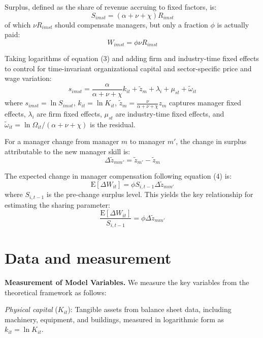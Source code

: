 \documentclass[11pt,a4paper]{article}
\begin{document}
Surplus, defined as the share of revenue accruing to fixed factors, is:
\begin{equation}
S_{imst} = (\alpha+\nu+\chi) R_{imst}
\end{equation}
of which $\nu R_{imst}$ should compensate managers, but only a fraction $\phi$ is actually paid:
\begin{equation}
W_{imst} = \phi\nu R_{imst}
\end{equation}

Taking logarithms of equation (3) and adding firm and industry-time fixed effects to control for time-invariant organizational capital and sector-specific price and wage variation:
\begin{equation}
s_{imst} = \frac{\alpha}{\alpha+\nu+\chi} k_{it} + \tilde{z}_{m} + \lambda_i + \mu_{st} + \tilde{\omega}_{it}
\end{equation}
where $s_{imst} = \ln S_{imst}$, $k_{it} = \ln K_{it}$, $\tilde{z}_m = \frac{\nu}{\alpha+\nu+\chi}z_{m}$ captures manager fixed effects, $\lambda_i$ are firm fixed effects, $\mu_{st}$ are industry-time fixed effects, and $\tilde{\omega}_{it} = \ln\Omega_{it}/(\alpha+\nu+\chi)$ is the residual.

For a manager change from manager $m$ to manager $m'$, the change in surplus attributable to the new manager skill is:
\begin{equation}
\Delta \tilde{z}_{mm'} = \tilde{z}_{m'} - \tilde{z}_{m}
\end{equation}

The expected change in manager compensation following equation (4) is:
\begin{equation}
\text{E}[\Delta W_{it}] = \phi S_{i,t-1} \Delta \tilde{z}_{mm'}
\end{equation}
where $S_{i,t-1}$ is the pre-change surplus level. This yields the key relationship for estimating the sharing parameter:
\begin{equation}
\frac{\text{E}[\Delta W_{it}]}{S_{i,t-1}} = \phi \Delta \tilde{z}_{mm'}
\end{equation}

\section{Data and measurement}

\textbf{Measurement of Model Variables.} We measure the key variables from the theoretical framework as follows:

\textit{Physical capital} ($K_{it}$): Tangible assets from balance sheet data, including machinery, equipment, and buildings, measured in logarithmic form as $k_{it} = \ln K_{it}$.
\end{document}
